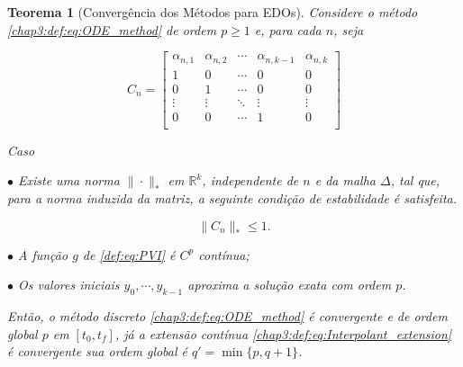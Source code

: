 \documentclass{beamer}
\newcommand{\R}{\mathbb{R}}
\theoremstyle{plain}
\newtheorem{teo}{Teorema}
\theoremstyle{definition}
\begin{document}
\begin{frame}%
    \begin{teo}[Convergência dos Métodos para EDOs]
        \label{chap3:teo:continuous_ODE}
        \scriptsize
        Considere o método \eqref{chap3:def:eq:ODE_method} de ordem $p \geq 1$ e, para cada $n$, seja

        \tiny
        \[
            C_n = 
            \begin{bmatrix}
                \alpha_{n, 1} & \alpha_{n, 2} & \cdots  & \alpha_{n, k - 1} & \alpha_{n, k} \\
                1 & 0 & \cdots & 0 & 0 \\
                0 & 1 & \cdots & 0 & 0 \\
                \vdots & \vdots & \ddots & \vdots & \vdots \\
                0 & 0 & \cdots & 1 & 0 \\
            \end{bmatrix}
        \]


        \scriptsize
        Caso 

        \phantom{aa} $\bullet$ Existe uma norma $\| \cdot \|_* $ em $\R^k$, independente de $n$ e da malha $\Delta$, tal que, para a norma induzida da matriz, a seguinte condição de estabilidade é satisfeita.

        \begin{equation}
            \| C_n \|_* \leq 1.
            \label{chap3:teo:ODE_methods_convergence:eq:stability_condition}
        \end{equation}

        \phantom{aa} $\bullet$ A função $g$ de \eqref{def:eq:PVI} é $C^p$ contínua;

        \phantom{aa} $\bullet$ Os valores iniciais $y_0, \cdots, y_{k-1}$ aproxima a solução exata com ordem $p$.

        Então, o método discreto \eqref{chap3:def:eq:ODE_method} é convergente e de ordem global $p$ em $[t_0, t_f]$, já a extensão contínua \eqref{chap3:def:eq:Interpolant_extension} é convergente sua ordem global é $q' = \min\{p, q+1\}$.
    \end{teo}


\end{frame}


\end{document}

